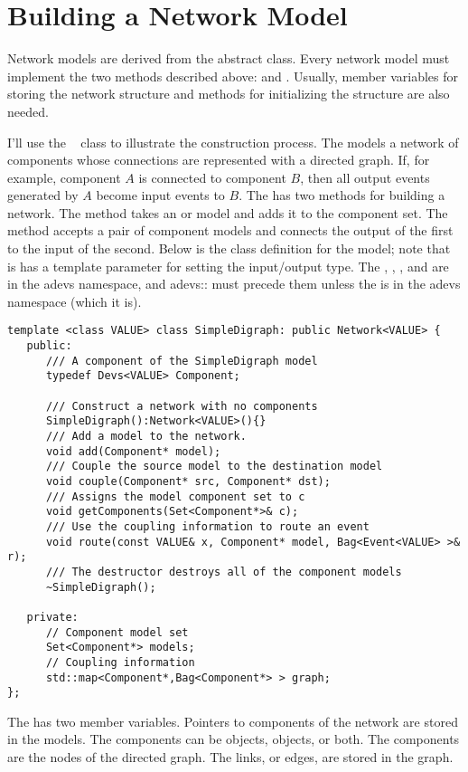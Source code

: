 \section{Building a Network Model}
Network models are derived from the abstract  class. Every network model must implement the two methods described above:  and . Usually, member variables for storing the network structure and methods for initializing the structure are also needed.

I'll use the \adevs\  class to illustrate the construction process. The  models a network of components whose connections are represented with a directed graph. If, for example, component $A$ is connected to component $B$, then all output events generated by $A$ become input events to $B$. The  has two methods for building a network. The  method takes an  or  model and adds it to the component set. The  method accepts a pair of component models and connects the output of the first to the input of the second. Below is the class definition for the model; note that is has a template parameter for setting the input/output type. The , , , and  are in the adevs namespace, and \mbox{adevs::} must precede them unless the  is in the adevs namespace (which it is). 
\begin{verbatim}
template <class VALUE> class SimpleDigraph: public Network<VALUE> { 
   public:
      /// A component of the SimpleDigraph model
      typedef Devs<VALUE> Component;

      /// Construct a network with no components
      SimpleDigraph():Network<VALUE>(){}
      /// Add a model to the network.
      void add(Component* model);
      /// Couple the source model to the destination model  
      void couple(Component* src, Component* dst);
      /// Assigns the model component set to c
      void getComponents(Set<Component*>& c);
      /// Use the coupling information to route an event
      void route(const VALUE& x, Component* model, Bag<Event<VALUE> >& r);
      /// The destructor destroys all of the component models
      ~SimpleDigraph();

   private:   
      // Component model set
      Set<Component*> models;
      // Coupling information
      std::map<Component*,Bag<Component*> > graph;
};
\end{verbatim}
The  has two member variables. Pointers to components of the network are stored in the  models. The components can be  objects,  objects, or both. The  components are the nodes of the directed graph. The links, or edges, are stored in the  graph.

